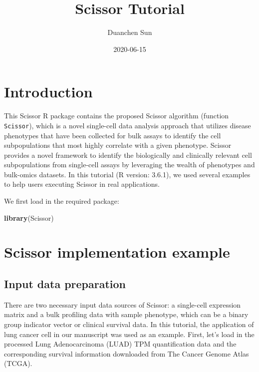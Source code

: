 \documentclass[]{article}
\title{Scissor Tutorial}
\author{Duanchen Sun}
\date{2020-06-15}
\newenvironment{Shaded}{\begin{snugshade}}{\end{snugshade}}
\newcommand{\KeywordTok}[1]{\textcolor[rgb]{0.13,0.29,0.53}{\textbf{#1}}}
\newcommand{\NormalTok}[1]{#1}
\begin{document}
\maketitle

{
\setcounter{tocdepth}{2}
\tableofcontents
}
\section{Introduction}\label{introduction}

This Scissor R package contains the proposed Scissor algorithm (function
\texttt{Scissor}), which is a novel single-cell data analysis approach
that utilizes disease phenotypes that have been collected for bulk
assays to identify the cell subpopulations that most highly correlate
with a given phenotype. Scissor provides a novel framework to identify
the biologically and clinically relevant cell subpopulations from
single-cell assays by leveraging the wealth of phenotypes and bulk-omics
datasets. In this tutorial (R version: 3.6.1), we used several examples
to help users executing Scissor in real applications.

We first load in the required package:

\begin{Shaded}
\begin{Highlighting}[]
\KeywordTok{library}\NormalTok{(Scissor)}
\end{Highlighting}
\end{Shaded}

\section{Scissor implementation
example}\label{scissor-implementation-example}

\subsection{Input data preparation}\label{input-data-preparation}

There are two necessary input data sources of Scissor: a single-cell
expression matrix and a bulk profiling data with sample phenotype, which
can be a binary group indicator vector or clinical survival data. In
this tutorial, the application of lung cancer cell in our manuscript was
used as an example. First, let's load in the processed Lung
Adenocarcinoma (LUAD) TPM quantification data and the corresponding
survival information downloaded from The Cancer Genome Atlas (TCGA).
\end{document}
